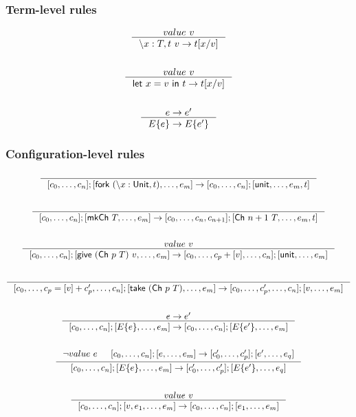 \documentclass{article}
\newcommand{\sco}[1]{\textsf{#1}}
\newcommand{\lam}[3]{\backslash #1 : #2, #3}
\newcommand{\unit}{\sco{unit}}
\newcommand{\letin}[3]{\sco{let } #1 = #2 \sco{ in } #3}
\newcommand{\fork}[1]{\sco{fork }#1}
\newcommand{\give}[2]{\sco{give } #1\ #2}
\newcommand{\take}[1]{\sco{take } #1}
\newcommand{\mkch}[1]{\sco{mkCh } #1}
\newcommand{\channel}[2]{\sco{Ch }#1\ #2}
\newcommand{\Unit}{\sco{Unit}}
\begin{document}
\subsubsection{Term-level rules}

\begin{gather*}
    \inference{
        value\ v
    }{
        \lam{x}{T}{t}\ v -> t[x/v]
    }\\
    \\
    \inference{
        value\ v
    }{
        \letin{x}{v}{t} -> t[x/v]
    }\\
    \\
    \inference{
        e -> e'
    }{
        E\{e\} -> E\{e'\}
    }
\end{gather*}

\subsubsection{Configuration-level rules}

\begin{gather*}
    \inference{}{
        [c_0,\dots,c_n];[\fork{(\lam{x}{\Unit}{t})},\dots,e_m] -> [c_0,\dots,c_n];[\unit,\dots,e_m,t]
    }\\
    \\
    \inference{}{
        [c_0,\dots,c_n];[\mkch{T},\dots,e_m] -> [c_0,\dots,c_n,c_{n+1}];[\channel{n+1}{T},\dots,e_m,t]
    }\\
    \\
    \inference{
        value\ v
    }{
        [c_0,\dots,c_n];[\give{(\channel{p}{T})}{v},\dots,e_m] ->
        [c_0,\dots,c_p + [v],\dots,c_n];[\unit,\dots,e_m]
    }\\
    \\
    \inference{}{
        [c_0,\dots,c_p = [v]+c_p',\dots,c_n];[\take{(\channel{p}{T})},\dots,e_m] ->
        [c_0,\dots,c_p',\dots,c_n];[v,\dots,e_m]
    }\\
    \\
    \inference{
        e -> e'
    }{
        [c_0,\dots,c_n];[E\{e\},\dots,e_m] ->
        [c_0,\dots,c_n];[E\{e'\},\dots,e_m]
    }\\
    \\
    \inference{
        \lnot value\ e &
        [c_0,\dots,c_n];[e,\dots,e_m] ->
        [c_0',\dots,c_p'];[e',\dots,e_q]
    }{
        [c_0,\dots,c_n];[E\{e\},\dots,e_m] ->
        [c_0',\dots,c_p'];[E\{e'\},\dots,e_q]
    }\\
    \\
    \inference{
        value\ v
    }{
        [c_0,\dots,c_n];[v,e_1,\dots,e_m] ->
        [c_0,\dots,c_n];[e_1,\dots,e_m]
    }
\end{gather*}
\end{document}
